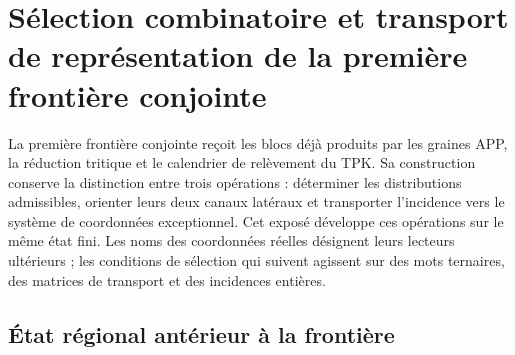
\section[Sélection et transport de la première frontière]{Sélection combinatoire et transport de représentation de la première frontière conjointe}
\label{r36c:sec:frontera}

La première frontière conjointe reçoit les blocs déjà produits par les graines APP, la réduction tritique et le calendrier de relèvement du TPK. Sa construction conserve la distinction entre trois opérations : déterminer les distributions admissibles, orienter leurs deux canaux latéraux et transporter l’incidence vers le système de coordonnées exceptionnel. Cet exposé développe ces opérations sur le même état fini. Les noms des coordonnées réelles désignent leurs lecteurs ultérieurs ; les conditions de sélection qui suivent agissent sur des mots ternaires, des matrices de transport et des incidences entières.

\subsection{État régional antérieur à la frontière}

